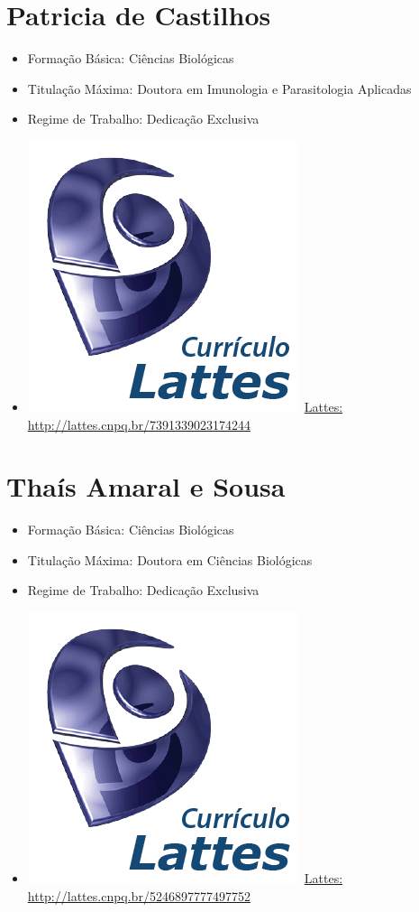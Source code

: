 \documentclass[11pt,fleqn]{book} %
\begin{document}
\section{Patricia de Castilhos}\label{PatriciaCastilhos}
\begin{itemize}
	\item Formação Básica: Ciências Biológicas
	\item Titulação Máxima: Doutora em Imunologia e Parasitologia Aplicadas
	\item Regime de Trabalho: Dedicação Exclusiva
	\item \includegraphics[scale=.03]{Pictures/lattes}~\href{http://lattes.cnpq.br/7391339023174244}{Lattes: http://lattes.cnpq.br/7391339023174244}
\end{itemize}

\section{Thaís Amaral e Sousa}\label{ThaísSousa}
\begin{itemize}
	\item Formação Básica: Ciências Biológicas
	\item Titulação Máxima: Doutora em Ciências Biológicas
	\item Regime de Trabalho: Dedicação Exclusiva
	\item \includegraphics[scale=.03]{Pictures/lattes}~\href{http://lattes.cnpq.br/5246897777497752}{Lattes: http://lattes.cnpq.br/5246897777497752}
\end{itemize}
\end{document}
